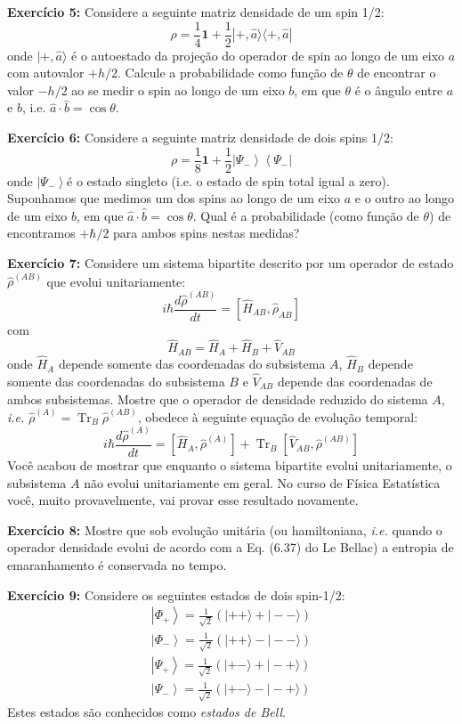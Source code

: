 \documentclass[12pt]{article}
\begin{document}
\textbf{Exercício 5:} Considere a seguinte matriz densidade de um spin 1/2:
\[
\rho=\frac{1}{4} \mathbf{1}+\frac{1}{2}|+, \hat{a}\rangle\langle+, \hat{a}|
\]
onde \(|+, \hat{a}\rangle\) é o autoestado da projeção do operador de spin ao longo de um eixo \(a\) com
autovalor \(+h / 2\). Calcule a probabilidade como função de \(\theta\) de encontrar o valor \(-h / 2\) ao se
medir o spin ao longo de um eixo \(b\), em que \(\theta\) é o ângulo entre \(a\) e \(b\), i.e. \(\hat{a} \cdot \hat{b}=\cos \theta\).

\textbf{Exercício 6:} Considere a seguinte matriz densidade de dois spins 1/2:
\[
\rho=\frac{1}{8} \mathbf{1}+\frac{1}{2}\left|\Psi_{-}\right\rangle\left\langle\Psi_{-}\right|
\]
onde \(\left|\Psi_{-}\right\rangle\)é o estado singleto (i.e. o estado de spin total igual a zero). Suponhamos que
medimos um dos spins ao longo de um eixo \(a\) e o outro ao longo de um eixo \(b\), em que
\(\hat{a} \cdot \hat{b}=\cos \theta\). Qual é a probabilidade (como função de \(\theta\)) de encontramos \(+\hbar / 2\) para ambos
spins nestas medidas?

\textbf{Exercício 7:} Considere um sistema bipartite descrito por um operador de estado \(\hat{\rho}^{(A B)}\) que evolui unitariamente:
\[
i \hbar \frac{d \hat{\rho}^{(A B)}}{d t}=\left[\hat{H}_{A B}, \hat{\rho}_{A B}\right]
\]
com
\[
\hat{H}_{A B}=\hat{H}_{A}+\hat{H}_{B}+\hat{V}_{A B}
\]
onde \(\hat{H}_{A}\) depende somente das coordenadas do subsistema \(A\), \(\hat{H}_{B}\) depende somente das
coordenadas do subsistema \(B\) e \(\hat{V}_{A B}\) depende das coordenadas de ambos subsistemas. Mostre
que o operador de densidade reduzido do sistema $A$, \textit{i.e.} \(\hat{\rho}^{(A)}=\operatorname{Tr}_{B} \hat{\rho}^{(A B)}\), obedece à seguinte
equação de evolução temporal:
\[
i \hbar \frac{d \hat{\rho}^{(A)}}{d t}=\left[\hat{H}_{A}, \hat{\rho}^{(A)}\right]+\operatorname{Tr}_{B}\left[\hat{V}_{A B}, \hat{\rho}^{(A B)}\right]
\]
Você acabou de mostrar que enquanto o sistema bipartite evolui unitariamente, o subsistema $A$ não evolui unitariamente em geral. No curso de Física Estatística você, muito provavelmente, vai provar esse resultado novamente.

\textbf{Exercício 8:} Mostre que sob evolução unitária (ou hamiltoniana, \textit{i.e.} quando o operador densidade
evolui de acordo com a Eq. (6.37) do Le Bellac) a entropia de emaranhamento é conservada no
tempo.

\textbf{Exercício 9:} Considere os seguintes estados de dois spin-1/2:
\[
\begin{aligned}
\left|\Phi_{+}\right\rangle=\frac{1}{\sqrt{2}}(|++\rangle+|--\rangle) \\ 
\left|\Phi_{-}\right\rangle=\frac{1}{\sqrt{2}}(|++\rangle-|--\rangle) \\ 
\left|\Psi_{+}\right\rangle=\frac{1}{\sqrt{2}}(|+-\rangle+|-+\rangle) \\ 
\left|\Psi_{-}\right\rangle=\frac{1}{\sqrt{2}}(|+-\rangle-|-+\rangle)
\end{aligned}
\]
Estes estados são conhecidos como \emph{estados de Bell}.
\end{document}
